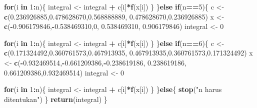 \documentclass[]{book}
\newenvironment{Shaded}{\begin{snugshade}}{\end{snugshade}}
\newcommand{\ControlFlowTok}[1]{\textcolor[rgb]{0.13,0.29,0.53}{\textbf{#1}}}
\newcommand{\DecValTok}[1]{\textcolor[rgb]{0.00,0.00,0.81}{#1}}
\newcommand{\FloatTok}[1]{\textcolor[rgb]{0.00,0.00,0.81}{#1}}
\newcommand{\KeywordTok}[1]{\textcolor[rgb]{0.13,0.29,0.53}{\textbf{#1}}}
\newcommand{\NormalTok}[1]{#1}
\newcommand{\OperatorTok}[1]{\textcolor[rgb]{0.81,0.36,0.00}{\textbf{#1}}}
\newcommand{\StringTok}[1]{\textcolor[rgb]{0.31,0.60,0.02}{#1}}
\theoremstyle{definition}
\theoremstyle{definition}
\theoremstyle{definition}
\theoremstyle{remark}
\begin{document}
\begin{Shaded}
\begin{Highlighting}[]
      \ControlFlowTok{for}\NormalTok{(i }\ControlFlowTok{in} \DecValTok{1}\OperatorTok{:}\NormalTok{n)\{}
\NormalTok{        integral <-}\StringTok{ }\NormalTok{integral }\OperatorTok{+}\StringTok{ }\NormalTok{c[i]}\OperatorTok{*}\KeywordTok{f}\NormalTok{(x[i])}
\NormalTok{      \}}
\NormalTok{    \}}\ControlFlowTok{else} \ControlFlowTok{if}\NormalTok{(n}\OperatorTok{==}\DecValTok{5}\NormalTok{)\{}
\NormalTok{      c <-}\StringTok{ }\KeywordTok{c}\NormalTok{(}\FloatTok{0.236926885}\NormalTok{,}\FloatTok{0.478628670}\NormalTok{,}\FloatTok{0.568888889}\NormalTok{,}
              \FloatTok{0.478628670}\NormalTok{,}\FloatTok{0.236926885}\NormalTok{)}
\NormalTok{      x <-}\StringTok{ }\KeywordTok{c}\NormalTok{(}\OperatorTok{-}\FloatTok{0.906179846}\NormalTok{,}\OperatorTok{-}\FloatTok{0.538469310}\NormalTok{,}\DecValTok{0}\NormalTok{,}
             \FloatTok{0.538469310}\NormalTok{, }\FloatTok{0.906179846}\NormalTok{)}
\NormalTok{      integral <-}\StringTok{ }\DecValTok{0}
      
      \ControlFlowTok{for}\NormalTok{(i }\ControlFlowTok{in} \DecValTok{1}\OperatorTok{:}\NormalTok{n)\{}
\NormalTok{        integral <-}\StringTok{ }\NormalTok{integral }\OperatorTok{+}\StringTok{ }\NormalTok{c[i]}\OperatorTok{*}\KeywordTok{f}\NormalTok{(x[i])}
\NormalTok{      \}}
\NormalTok{    \}}\ControlFlowTok{else} \ControlFlowTok{if}\NormalTok{(n}\OperatorTok{==}\DecValTok{6}\NormalTok{)\{}
\NormalTok{      c <-}\StringTok{ }\KeywordTok{c}\NormalTok{(}\FloatTok{0.171324492}\NormalTok{,}\FloatTok{0.360761573}\NormalTok{,}\FloatTok{0.467913935}\NormalTok{,}
              \FloatTok{0.467913935}\NormalTok{,}\FloatTok{0.360761573}\NormalTok{,}\FloatTok{0.171324492}\NormalTok{)}
\NormalTok{      x <-}\StringTok{ }\KeywordTok{c}\NormalTok{(}\OperatorTok{-}\FloatTok{0.932469514}\NormalTok{,}\OperatorTok{-}\FloatTok{0.661209386}\NormalTok{,}\OperatorTok{-}\FloatTok{0.238619186}\NormalTok{,}
             \FloatTok{0.238619186}\NormalTok{, }\FloatTok{0.661209386}\NormalTok{,}\FloatTok{0.932469514}\NormalTok{)}
\NormalTok{      integral <-}\StringTok{ }\DecValTok{0}
      
      \ControlFlowTok{for}\NormalTok{(i }\ControlFlowTok{in} \DecValTok{1}\OperatorTok{:}\NormalTok{n)\{}
\NormalTok{        integral <-}\StringTok{ }\NormalTok{integral }\OperatorTok{+}\StringTok{ }\NormalTok{c[i]}\OperatorTok{*}\KeywordTok{f}\NormalTok{(x[i])}
\NormalTok{      \}}
\NormalTok{    \}}\ControlFlowTok{else}\NormalTok{\{}
      \KeywordTok{stop}\NormalTok{(}\StringTok{"n harus ditentukan"}\NormalTok{)}
\NormalTok{    \}}
    \KeywordTok{return}\NormalTok{(integral)}
\NormalTok{\}}
\end{Highlighting}
\end{Shaded}
\end{document}
